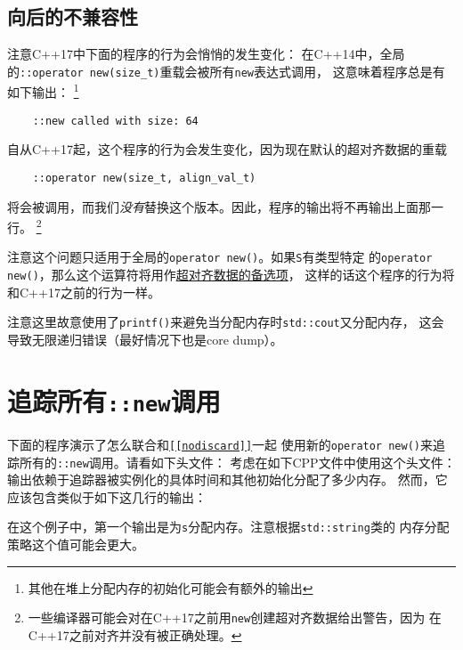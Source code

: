 \subsection{向后的不兼容性}
注意C++17中下面的程序的行为会悄悄的发生变化：
在C++14中，全局的\texttt{::operator new(size\_t)}重载会被所有\texttt{new}表达式调用，
这意味着程序总是有如下输出：
\footnote{其他在堆上分配内存的初始化可能会有额外的输出}
\begin{lstlisting}
    ::new called with size: 64
\end{lstlisting}
自从C++17起，这个程序的行为会发生变化，因为现在默认的超对齐数据的重载
\begin{lstlisting}
    ::operator new(size_t, align_val_t)
\end{lstlisting}
将会被调用，而我们\emph{没有}替换这个版本。因此，程序的输出将不再输出上面那一行。
\footnote{一些编译器可能会对在C++17之前用\texttt{new}创建超对齐数据给出警告，因为
在C++17之前对齐并没有被正确处理。}

注意这个问题只适用于全局的\texttt{operator new()}。如果\texttt{S}有类型特定
的\texttt{operator new()}，那么这个运算符将用作\hyperref[ch30.2.2.2]{超对齐数据的备选项}，
这样的话这个程序的行为将和C++17之前的行为一样。

注意这里故意使用了\texttt{printf()}来避免当分配内存时\texttt{std::cout}又分配内存，
这会导致无限递归错误（最好情况下也是core dump）。


\section{追踪所有\texttt{::new}调用}\label{ch30.4}
下面的程序演示了怎么联合和\hyperref[ch7.1]{\texttt{[[nodiscard]]}}一起
使用新的\texttt{operator new()}来追踪所有的\texttt{::new}调用。请看如下头文件：
考虑在如下CPP文件中使用这个头文件：
输出依赖于追踪器被实例化的具体时间和其他初始化分配了多少内存。
然而，它应该包含类似于如下这几行的输出：
在这个例子中，第一个输出是为\texttt{s}分配内存。注意根据\texttt{std::string}类的
内存分配策略这个值可能会更大。

